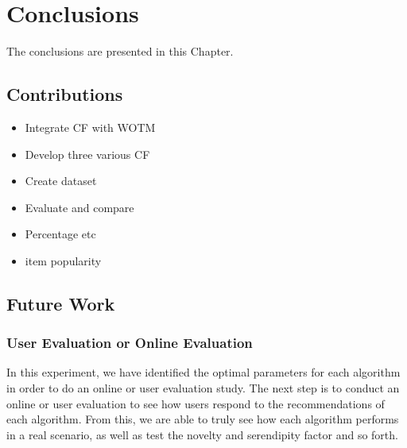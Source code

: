 \chapter{Conclusions}\label{C:con}
The conclusions are presented in this Chapter.

\section{Contributions}
\begin{itemize}
	\item{Integrate CF with WOTM}
	\item{Develop three various CF}
	\item{Create dataset}
	\item{Evaluate and compare}
	\item{Percentage etc}
	\item{item popularity}
\end{itemize}

\section{Future Work}


\subsection{User Evaluation or Online Evaluation}
In this experiment, we have identified the optimal parameters for each algorithm in order to do an online or user evaluation study. The next step is to conduct an online or user evaluation to see how users respond to the recommendations of each algorithm. From this, we are able to truly see how each algorithm performs in a real scenario, as well as test the novelty and serendipity factor and so forth. 


